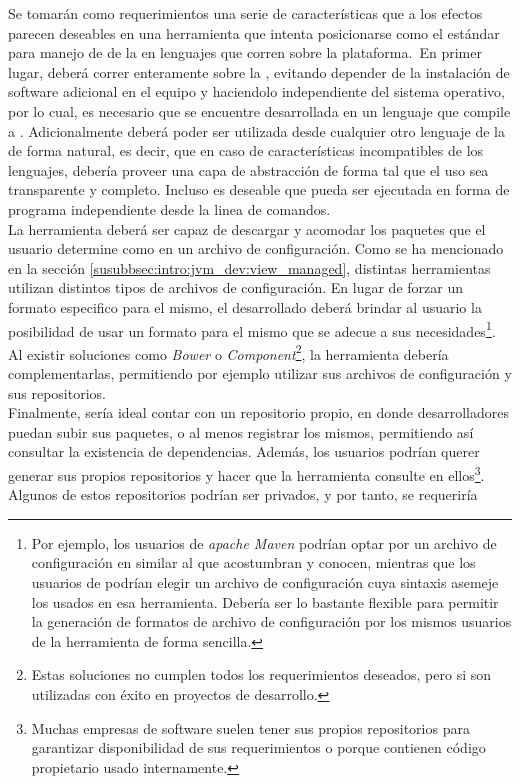Se tomarán como requerimientos una serie de características que a los efectos
parecen deseables en una herramienta que intenta posicionarse como el
estándar para manejo de \dependencies de la \viewtier en lenguajes que corren
sobre la plataforma.\
En primer lugar, deberá correr enteramente sobre la \jvm, evitando depender de
la instalación de software adicional en el equipo y haciendolo independiente
del sistema operativo, por lo cual, es necesario que se encuentre desarrollada
en un lenguaje que compile a \bytecode \java.
Adicionalmente deberá poder ser utilizada desde cualquier otro lenguaje de
la \jvm de forma natural, es decir, que en caso de características incompatibles
de los lenguajes, debería proveer una capa de abstracción de forma tal que
el uso sea transparente y completo. Incluso es deseable que pueda ser
ejecutada en forma de programa independiente desde la linea de comandos.\\
La herramienta deberá ser capaz de descargar y acomodar los paquetes que el
usuario determine como \dependencies en un archivo de configuración. Como se ha
mencionado en la sección \ref{susubbsec:intro:jvm_dev:view_managed}, distintas
herramientas utilizan distintos tipos de archivos de configuración. En lugar de
forzar un formato especifico para el mismo, el \depmgr desarrollado deberá
brindar al usuario la posibilidad de usar un formato para el mismo que se
adecue a sus necesidades\footnote{
	Por ejemplo, los usuarios de \emph{apache Maven} podrían optar por un archivo
	de configuración en \xml similar al que acostumbran y conocen, mientras
	que los usuarios de \sbt podrían elegir un archivo de configuración cuya
	sintaxis asemeje los usados en esa herramienta. Debería ser lo bastante flexible
	para permitir la generación de formatos de archivo de configuración por los
	mismos usuarios de la herramienta de forma sencilla.
}.\\
Al existir soluciones como \emph{Bower} o \emph{Component}\footnote{
	Estas soluciones no cumplen todos los requerimientos deseados, pero si son
	utilizadas con éxito en proyectos de desarrollo.
}, la herramienta debería complementarlas, permitiendo por ejemplo
utilizar sus archivos de configuración y sus repositorios.\\
Finalmente, sería ideal contar con un repositorio propio, en donde desarrolladores
puedan subir sus paquetes, o al menos registrar los mismos, permitiendo así
consultar la existencia de dependencias. Además, los usuarios podrían querer
generar sus propios repositorios y hacer que la herramienta consulte en
ellos\footnote{
	Muchas empresas de software suelen tener sus propios repositorios para
	garantizar disponibilidad de sus requerimientos o porque contienen código
	propietario usado internamente.
}. Algunos de estos repositorios podrían ser privados, y por tanto, se requeriría
